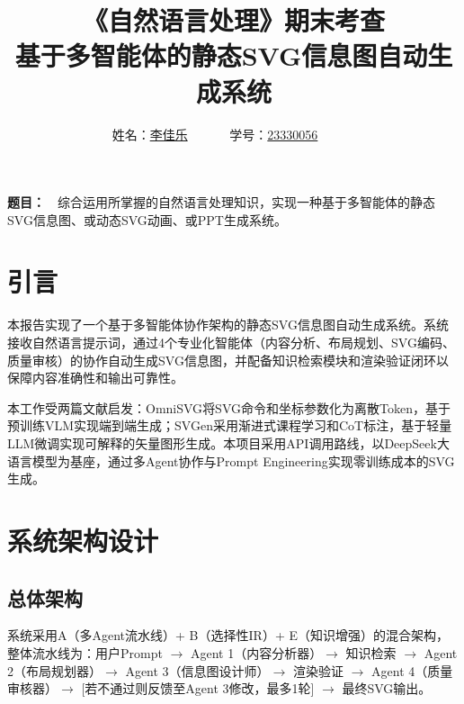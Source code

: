 \documentclass[11pt,a4paper]{article}
\begin{document}
\title{
{\heiti《自然语言处理》期末考查\\[6pt]
基于多智能体的静态SVG信息图自动生成系统}
}
\date{}
\author{
姓名：\underline{李佳乐}~~~~~~
学号：\underline{23330056}~~~~~~}

\maketitle

\noindent
{\bf 题目：}~~综合运用所掌握的自然语言处理知识，实现一种基于多智能体的静态SVG信息图、或动态SVG动画、或PPT生成系统。

\vspace{3pt}
\noindent



\section{引言}

本报告实现了一个基于多智能体协作架构的静态SVG信息图自动生成系统。系统接收自然语言提示词，通过4个专业化智能体（内容分析、布局规划、SVG编码、质量审核）的协作自动生成SVG信息图，并配备知识检索模块和渲染验证闭环以保障内容准确性和输出可靠性。

本工作受两篇文献启发：OmniSVG\cite{omnisvg}将SVG命令和坐标参数化为离散Token，基于预训练VLM实现端到端生成；SVGen\cite{svgen}采用渐进式课程学习和CoT标注，基于轻量LLM微调实现可解释的矢量图形生成。本项目采用API调用路线，以DeepSeek大语言模型\cite{deepseek}为基座，通过多Agent协作与Prompt Engineering实现零训练成本的SVG生成。


\section{系统架构设计}

\subsection{总体架构}

系统采用A（多Agent流水线）+ B（选择性IR）+ E（知识增强）的混合架构，整体流水线为：用户Prompt $\rightarrow$ Agent 1（内容分析器）$\rightarrow$ 知识检索 $\rightarrow$ Agent 2（布局规划器）$\rightarrow$ Agent 3（信息图设计师）$\rightarrow$ 渲染验证 $\rightarrow$ Agent 4（质量审核器）$\rightarrow$ [若不通过则反馈至Agent 3修改，最多1轮] $\rightarrow$ 最终SVG输出。
\end{document}
